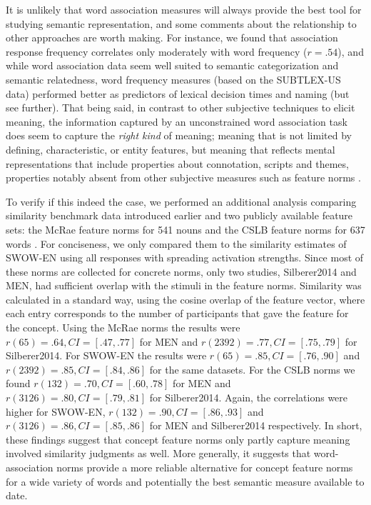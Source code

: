 \documentclass[a4paper,doc,natbib,floatsintext]{apa6}
\begin{document}
It is unlikely that word association measures will always provide the best tool for studying semantic representation, and some comments about the relationship to other approaches are worth making. For instance, we found that association response frequency correlates only moderately with word frequency ($r = .54$), and while word association data seem well suited to semantic categorization and semantic relatedness, word frequency measures (based on the SUBTLEX-US data) performed better as predictors of lexical decision times and naming (but see further). That being said, in contrast to other subjective techniques to elicit meaning, the information captured by an unconstrained  word association task does seem to capture the {\it right kind} of meaning; meaning that is not limited by defining, characteristic, or entity features, but meaning that reflects mental representations that include properties about connotation, scripts and themes, properties notably absent from other subjective measures such as feature norms \citep{DeDeyne2008,McRae2005}.

To verify if this indeed the case, we performed an additional analysis comparing similarity benchmark data introduced earlier and two publicly available feature sets: the McRae feature norms for 541 nouns \citep{McRae2005} and the CSLB feature norms for 637 words \citep{Devereux2014}. For conciseness, we only compared them to the similarity estimates of SWOW-EN using all responses with spreading activation strengths. Since most of these norms are collected for concrete norms, only two studies, Silberer2014 and MEN, had sufficient overlap with the stimuli in the feature norms. Similarity was calculated in a standard way, using the cosine overlap of the feature vector, where each entry corresponds to the number of participants that gave the feature for the concept.
Using the McRae norms the results were  $r(65) = .64, CI = [.47,.77]$ for MEN and $r(2392) = .77, CI = [.75,.79]$ for Silberer2014. For SWOW-EN the results were $r(65) = .85, CI = [.76,.90]$ and $r(2392) = .85, CI = [.84,.86]$ for the same datasets.  For the CSLB norms we found $r(132) = .70, CI = [.60,.78]$ for MEN and $r(3126) = .80, CI = [.79,.81]$ for Silberer2014. Again, the correlations were higher for SWOW-EN, $r(132) = .90, CI = [.86,.93]$ and $r(3126) = .86, CI = [.85,.86]$ for MEN and Silberer2014 respectively. In short, these findings suggest that concept feature norms only partly capture meaning involved similarity judgments as well. More generally, it suggests that word-association norms provide a more reliable alternative for concept feature norms for a wide variety of words and potentially the best semantic measure available to date.
\end{document}
